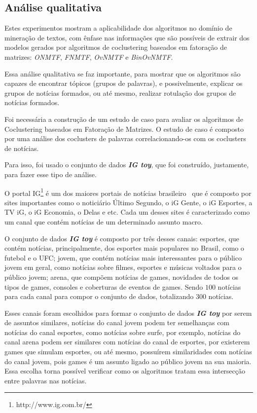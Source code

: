 \documentclass[
    12pt,                %
    oneside,            %
    a4paper,            %
    english,            %
    brazil                %
    ]{abntex2ppgsi}
\begin{document}
\subsection{Análise qualitativa}

Estes experimentos mostram a aplicabilidade dos algoritmos no domínio de mineração de textos, com ênfase nas informações que são possíveis de extrair dos modelos gerados por algoritmos de coclustering baseados em fatoração de matrizes: \textit{ONMTF}, \textit{FNMTF}, \textit{OvNMTF} e \textit{BinOvNMTF}.

Essa análise qualitativa se faz importante, para mostrar que os algoritmos são capazes de encontrar tópicos (grupos de palavras), e possivelmente, explicar os grupos de notícias formados, ou até mesmo, realizar rotulação dos grupos de notícias formados.

Foi necessária a construção de um estudo de caso para avaliar os algoritmos de Coclustering baseados em Fatoração de Matrizes.
O estudo de caso é composto por uma análise dos coclusters de palavras correlacionando-os com os coclusters de notícias.

Para isso, foi usado o conjunto de dados \textit{\textbf{IG toy}}, que foi construído, justamente, para fazer esse tipo de análise.

O portal IG\footnote{http://www.ig.com.br/} é um dos maiores portais de notícias brasileiro~\cite{topsites} que é composto por sites importantes como o noticiário Último Segundo, o iG Gente, o iG Esportes, a TV iG, o iG Economia, o Delas e etc.
Cada um desses sites é caracterizado como um canal que contém notícias de um determinado assunto macro.

O conjunto de dados \textit{\textbf{IG toy}} é composto por três desses canais: esportes, que contém notícias, principalmente, dos esportes mais populares no Brasil, como o futebol e o UFC; jovem, que contém notícias mais interessantes para o público jovem em geral, como notícias sobre filmes, esportes e músicas voltados para o público jovem; arena, que compõem notícias de games, novidades de todos os tipos de games, consoles e coberturas de eventos de games.
Sendo $100$ notícias para cada canal para compor o conjunto de dados, totalizando $300$ notícias.

Esses canais foram escolhidos para formar o conjunto de dados \textit{\textbf{IG toy}} por serem de assuntos similares, notícias do canal jovem podem ter semelhanças com notícias do canal esportes, como notícias sobre surfe, por exemplo, notícias do canal arena podem ser similares com notícias do canal de esportes, por existerem games que simulam esportes, ou até mesmo, possuírem similaridades com notícias do canal jovem, pois games é um assunto ligado ao público jovem na sua maioria.
Essa escolha torna possível verificar como os algoritmos tratam essa intersecção entre palavras nas notícias.
\end{document}
